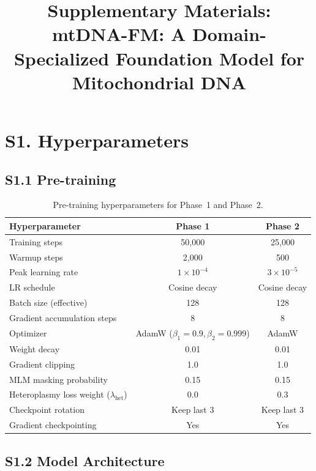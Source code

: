 \documentclass[10pt]{article}
\begin{document}
\title{\textbf{Supplementary Materials:\\
mtDNA-FM: A Domain-Specialized Foundation Model for Mitochondrial DNA}}
\author{}
\date{}
\maketitle

\section*{S1. Hyperparameters}

\subsection*{S1.1 Pre-training}

\begin{table}[h]
\centering
\caption{Pre-training hyperparameters for Phase~1 and Phase~2.}
\begin{tabular}{lcc}
\toprule
\textbf{Hyperparameter} & \textbf{Phase 1} & \textbf{Phase 2} \\
\midrule
Training steps & 50,000 & 25,000 \\
Warmup steps & 2,000 & 500 \\
Peak learning rate & $1 \times 10^{-4}$ & $3 \times 10^{-5}$ \\
LR schedule & Cosine decay & Cosine decay \\
Batch size (effective) & 128 & 128 \\
Gradient accumulation steps & 8 & 8 \\
Optimizer & AdamW ($\beta_1=0.9, \beta_2=0.999$) & AdamW \\
Weight decay & 0.01 & 0.01 \\
Gradient clipping & 1.0 & 1.0 \\
MLM masking probability & 0.15 & 0.15 \\
Heteroplasmy loss weight ($\lambda_\text{het}$) & 0.0 & 0.3 \\
Checkpoint rotation & Keep last 3 & Keep last 3 \\
Gradient checkpointing & Yes & Yes \\
\bottomrule
\end{tabular}
\end{table}

\subsection*{S1.2 Model Architecture}
\end{document}
